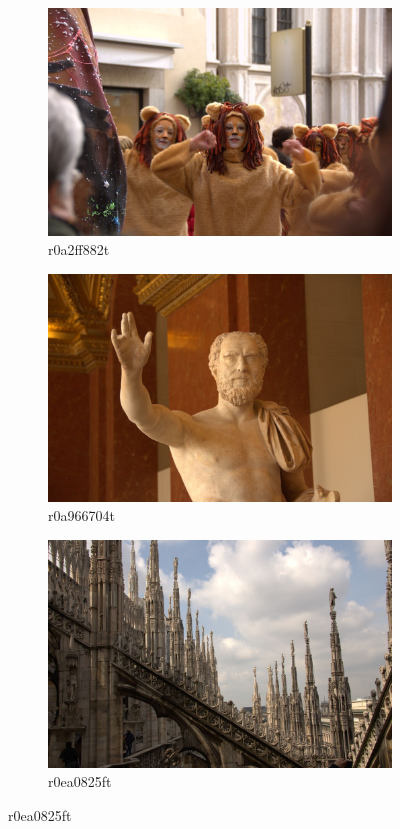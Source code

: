 \documentclass{ipol}
\begin{document}
\begin{figure}[ht]
    \begin{subfigure}[c]{.31\linewidth}\centering
    \includegraphics[width=\linewidth]{images/original/r07ffdc87t.jpeg}
    \caption{r0a2ff882t}
    \end{subfigure}\hfill%
    \begin{subfigure}[c]{.31\linewidth}\centering
    \includegraphics[width=\linewidth]{images/original/r16da5576t.jpeg}
    \caption{r0a966704t}
    \end{subfigure}\hfill%
    \begin{subfigure}[c]{.31\linewidth}\centering
    \includegraphics[width=\linewidth]{images/original/r191f3cdet.jpeg}
    \caption{r0ea0825ft}
    \end{subfigure}
    

\end{figure}
\end{document}
